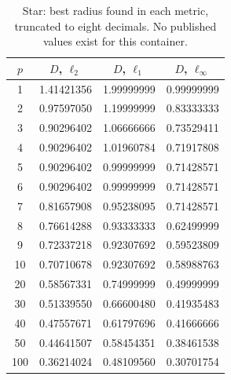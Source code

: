 \begin{table}[t]
  \centering
  \caption{Star: best radius found in each metric, truncated to eight decimals. No published values exist for this container.}
  \label{tab:pointy_star}
  \begin{tabular}{cccc}
    \hline
    $p$ & $D$, $\ell_2$ & $D$, $\ell_1$ & $D$, $\ell_\infty$ \\
    \hline
    1 & 1.41421356 & 1.99999999 & 0.99999999 \\
    2 & 0.97597050 & 1.19999999 & 0.83333333 \\
    3 & 0.90296402 & 1.06666666 & 0.73529411 \\
    4 & 0.90296402 & 1.01960784 & 0.71917808 \\
    5 & 0.90296402 & 0.99999999 & 0.71428571 \\
    6 & 0.90296402 & 0.99999999 & 0.71428571 \\
    7 & 0.81657908 & 0.95238095 & 0.71428571 \\
    8 & 0.76614288 & 0.93333333 & 0.62499999 \\
    9 & 0.72337218 & 0.92307692 & 0.59523809 \\
    10 & 0.70710678 & 0.92307692 & 0.58988763 \\
    20 & 0.58567331 & 0.74999999 & 0.49999999 \\
    30 & 0.51339550 & 0.66600480 & 0.41935483 \\
    40 & 0.47557671 & 0.61797696 & 0.41666666 \\
    50 & 0.44641507 & 0.58454351 & 0.38461538 \\
    100 & 0.36214024 & 0.48109560 & 0.30701754 \\
    \hline
  \end{tabular}
\end{table}
